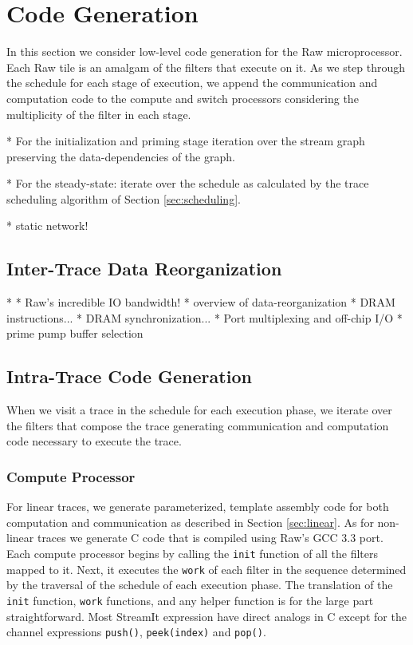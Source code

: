 \section{Code Generation}
\label{sec:codegen}
In this section we consider low-level code generation for the Raw
microprocessor. Each Raw tile is an amalgam of the filters that
execute on it. As we step through the schedule for each stage of
execution, we append the communication and computation code to the
compute and switch processors considering the multiplicity of the
filter in each stage.


* For the initialization and priming stage iteration over the stream
graph preserving the data-dependencies of the graph.

* For the steady-state: iterate over the schedule as calculated by the trace scheduling
algorithm of Section \ref{sec:scheduling}.

* static network!

\subsection{Inter-Trace Data Reorganization}
* * Raw's incredible IO bandwidth!
* overview of data-reorganization
* DRAM instructions...
* DRAM synchronization...
* Port multiplexing and off-chip I/O
* prime pump buffer selection

\subsection{Intra-Trace Code Generation}
When we visit a trace in the schedule for each execution phase, we
iterate over the filters that compose the trace generating 
communication and computation code necessary to execute the trace.

\subsubsection{Compute Processor}
For linear traces, we generate parameterized, template assembly code
for both computation and communication as described in Section
\ref{sec:linear}.  As for non-linear traces we generate C code that is
compiled using Raw's GCC 3.3 port.  Each compute processor begins by
calling the {\tt init} function of all the filters mapped to it.  Next,
it executes the {\tt work} of each filter in the sequence determined
by the traversal of the schedule of each execution phase.
The translation of the {\tt init} function, {\tt work} functions, and
any helper function is for the large part straightforward.  Most
StreamIt expression have direct analogs in C except for the channel
expressions {\tt push()}, {\tt peek(index)} and {\tt pop()}.

